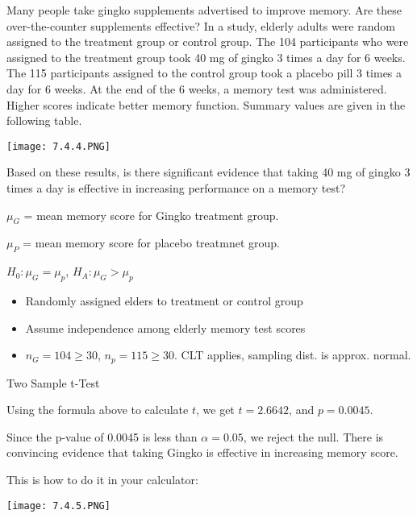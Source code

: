 \documentclass[../stats.tex]{subfiles}
\begin{document}
\pagebreak
\begin{example}
    Many people take gingko supplements advertised to improve memory. Are these over-the-counter supplements effective? In a study, elderly adults were random assigned to the treatment group or control group. 
    The 104 participants who were assigned to the treatment group took 40 mg of gingko 3 times a day for 6 weeks. The 115 participants assigned to the control group took a placebo pill 3 times a day for 6 weeks. At 
    the end of the 6 weeks, a memory test was administered. Higher scores indicate better memory function. Summary values are given in the following table.

    \begin{center}
        \texttt{[image: 7.4.4.PNG]}
    \end{center}
    Based on these results, is there significant evidence that taking 40 mg of gingko 3 times a day is effective in increasing performance on a memory test?

    $\mu_G$ = mean memory score for Gingko treatment group.

    $\mu_P$ = mean memory score for placebo treatmnet group.

    $H_0: \mu_G=\mu_p$, $H_A: \mu_G>\mu_p$

    \begin{itemize}
        \item Randomly assigned elders to treatment or control group
        \item Assume independence among elderly memory test scores 
        \item $n_G=104\geq 30$, $n_p=115\geq 30$. CLT applies, sampling dist. is approx. normal.
    \end{itemize}

    Two Sample t-Test 

    Using the formula above to calculate $t$, we get $t=2.6642$, and $p=0.0045$.

    Since the p-value of 0.0045 is less than $\alpha=0.05$, we reject the null. There is convincing evidence that taking Gingko is effective in increasing memory score.

    This is how to do it in your calculator:
    \begin{center}
        \texttt{[image: 7.4.5.PNG]}
    \end{center}
\end{example}
\end{document}
